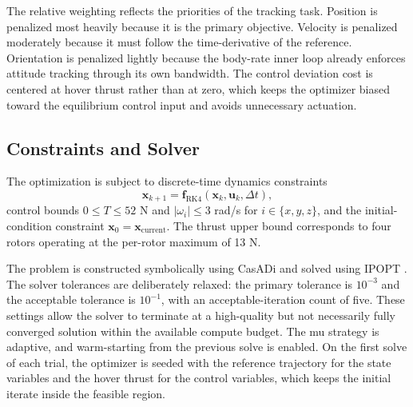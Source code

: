 \documentclass[conference]{IEEEtran}
\begin{document}
The relative weighting reflects the priorities of the tracking task. Position is penalized most heavily because it is the primary objective. Velocity is penalized moderately because it must follow the time-derivative of the reference. Orientation is penalized lightly because the body-rate inner loop already enforces attitude tracking through its own bandwidth. The control deviation cost is centered at hover thrust rather than at zero, which keeps the optimizer biased toward the equilibrium control input and avoids unnecessary actuation.

\subsection{Constraints and Solver}
The optimization is subject to discrete-time dynamics constraints
\begin{equation}
\mathbf{x}_{k+1} = \mathbf{f}_{\text{RK4}}(\mathbf{x}_k, \mathbf{u}_k, \Delta t),
\end{equation}
control bounds $0 \leq T \leq 52$ N and $|\omega_i| \leq 3$ rad/s for $i \in \{x, y, z\}$, and the initial-condition constraint $\mathbf{x}_0 = \mathbf{x}_{\text{current}}$. The thrust upper bound corresponds to four rotors operating at the per-rotor maximum of 13 N.

The problem is constructed symbolically using CasADi \cite{andersson2019casadi} and solved using IPOPT \cite{wachter2006implementation}. The solver tolerances are deliberately relaxed: the primary tolerance is $10^{-3}$ and the acceptable tolerance is $10^{-1}$, with an acceptable-iteration count of five. These settings allow the solver to terminate at a high-quality but not necessarily fully converged solution within the available compute budget. The mu strategy is adaptive, and warm-starting from the previous solve is enabled. On the first solve of each trial, the optimizer is seeded with the reference trajectory for the state variables and the hover thrust for the control variables, which keeps the initial iterate inside the feasible region.
\end{document}
